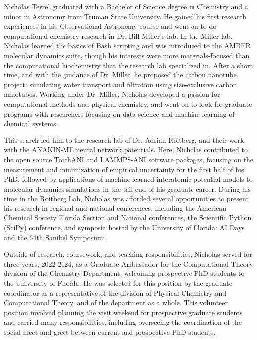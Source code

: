 Nicholas Terrel graduated with a Bachelor of Science degree in Chemistry and a minor in Astronomy from Truman State University.
He gained his first research experiences in his Observational Astronomy course and went on to do computational chemistry research in Dr. Bill Miller's lab.
In the Miller lab, Nicholas learned the basics of Bash scripting and was introduced to the AMBER molecular dynamics suite, though his interests were more materials-focused than the computational biochemistry that the research lab specialized in.
After a short time, and with the guidance of Dr. Miller, he proposed the carbon nanotube project: simulating water transport and filtration using size-exclusive carbon nanotubes.
Working under Dr. Miller, Nicholas developed a passion for computational methods and physical chemistry, and went on to look for graduate programs with researchers focusing on data science and machine learning of chemical systems.

This search led him to the research lab of Dr. Adrian Roitberg, and their work with the ANAKIN-ME neural network potentials. 
Here, Nicholas contributed to the open source TorchANI and LAMMPS-ANI software packages, focusing on the measurement and minimization of empirical uncertainty for the first half of his PhD, followed by applications of machine-learned interatomic potential models to molecular dynamics simulations in the tail-end of his graduate career.
During his time in the Roitberg Lab, Nicholas was afforded several opportunities to present his research in regional and national conferences, including the American Chemical Society Florida Section and National conferences, the Scientific Python (SciPy) conference, and symposia hosted by the University of Florida: AI Days and the 64th Sanibel Symposium. 

Outside of research, coursework, and teaching responsibilities, Nicholas served for three years, 2022-2024, as a Graduate Ambassador for the Computational Theory division of the Chemistry Department, welcoming prospective PhD students to the University of Florida.
He was selected for this position by the graduate coordinator as a representative of the division of Physical Chemistry and Computational Theory, and of the department as a whole.
This volunteer position involved planning the visit weekend for prospective graduate students and carried many responsibilities, including overseeing the coordination of the social meet and greet between current and prospective PhD students.

